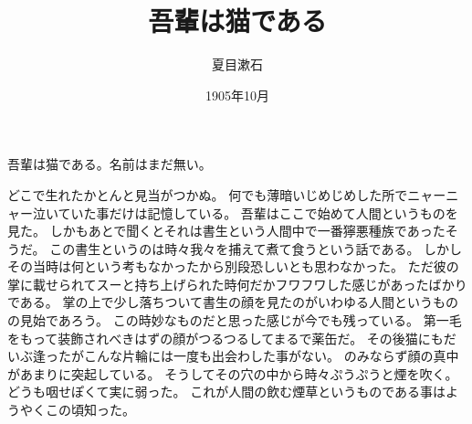 \documentclass{tarticle}
\title{吾輩は猫である}
\author{夏目漱石}
\date{1905年10月}
\begin{document}
吾輩は猫である。名前はまだ無い。

どこで生れたかとんと見当がつかぬ。
何でも薄暗いじめじめした所でニャーニャー泣いていた事だけは記憶している。
吾輩はここで始めて人間というものを見た。
しかもあとで聞くとそれは書生という人間中で一番獰悪種族であったそうだ。
この書生というのは時々我々を捕えて煮て食うという話である。
しかしその当時は何という考もなかったから別段恐しいとも思わなかった。
ただ彼の掌に載せられてスーと持ち上げられた時何だかフワフワした感じがあったばかりである。
掌の上で少し落ちついて書生の顔を見たのがいわゆる人間というものの見始であろう。
この時妙なものだと思った感じが今でも残っている。
第一毛をもって装飾されべきはずの顔がつるつるしてまるで薬缶だ。
その後猫にもだいぶ逢ったがこんな片輪には一度も出会わした事がない。
のみならず顔の真中があまりに突起している。
そうしてその穴の中から時々ぷうぷうと煙を吹く。
どうも咽せぽくて実に弱った。
これが人間の飲む煙草というものである事はようやくこの頃知った。
\end{document}
